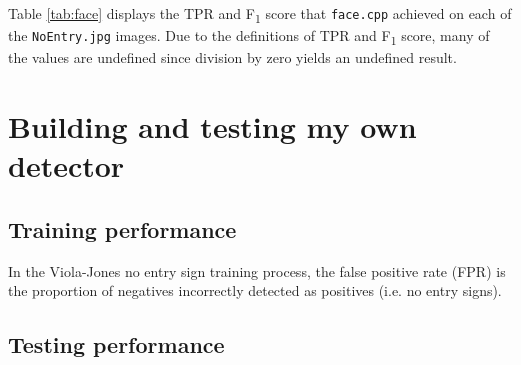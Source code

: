 \documentclass[twocolumn, 10pt, a4paper]{article}
\begin{document}
Table \ref{tab:face} displays the TPR and F\textsubscript{1} score that \texttt{face.cpp} achieved on each of the \texttt{NoEntry\textasteriskcentered.jpg} images.
Due to the definitions of TPR and F\textsubscript{1} score, many of the values are undefined since division by zero yields an undefined result.

\clearpage

\section{Building and testing my own detector}

\subsection{Training performance}

In the Viola-Jones no entry sign training process, the false positive rate (FPR) is the proportion of negatives incorrectly detected as positives (i.e. no entry signs).


\subsection{Testing performance}
\end{document}
